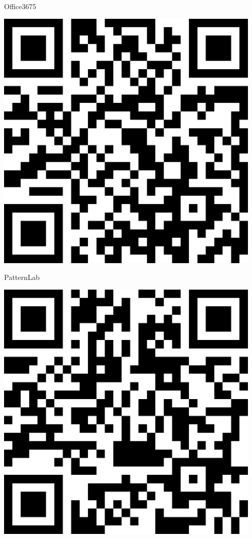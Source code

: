 \documentclass[letterpaper]{article}
\begin{document}
 \hfill{\small Office3675} 

 \vspace{1in} 
 \pagebreak 
{} 
 \vspace*{\fill} 
 \begingroup 
 \centerline{\includegraphics[scale=1,width=5in,height=5in]{PatternLab.png}} 
 \endgroup 
 \vspace*{\fill} 

 \hfill{\small PatternLab} 

 \vspace{1in} 
 \pagebreak 
{} 
 \vspace*{\fill} 
 \begingroup 
 \centerline{\includegraphics[scale=1,width=5in,height=5in]{RNDLab.png}} 
 \endgroup 
 \vspace*{\fill} 
\end{document}
